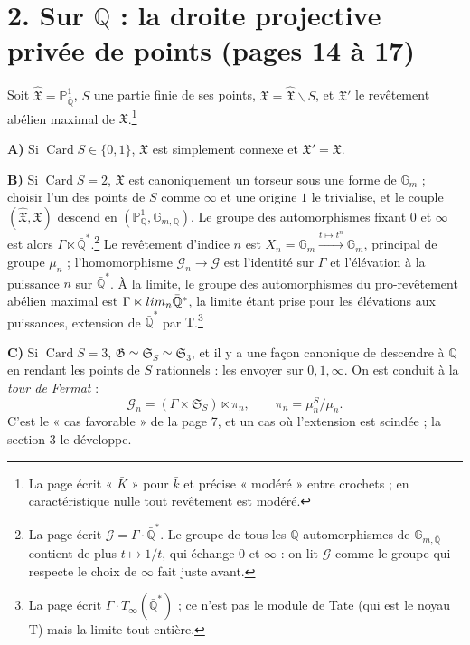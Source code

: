 \documentclass[11pt,a4paper]{article}
\begin{document}
\section*{2. Sur $\mathbb{Q}$ : la droite projective privée de points (pages 14 à 17)}

Soit $\hat{\mathfrak{X}} = \mathbb{P}^{1}_{\bar{\mathbb{Q}}}$, $S$ une partie
finie de ses points, $\mathfrak{X} = \hat{\mathfrak{X}} \smallsetminus S$, et
$\mathfrak{X}'$ le revêtement abélien maximal de $\mathfrak{X}$.\footnote{La
page écrit « $\bar{K}$ » pour $\bar{k}$ et précise « modéré » entre crochets ;
en caractéristique nulle tout revêtement est modéré.}

\textbf{A)} Si $\operatorname{Card} S \in \{0, 1\}$, $\mathfrak{X}$ est
simplement connexe et $\mathfrak{X}' = \mathfrak{X}$.

\textbf{B)} Si $\operatorname{Card} S = 2$, $\mathfrak{X}$ est canoniquement un
torseur sous une forme de $\mathbb{G}_{m}$ ; choisir l'un des points de $S$
comme $\infty$ et une origine $1$ le trivialise, et le couple
$(\hat{\mathfrak{X}}, \mathfrak{X})$ descend en $(\mathbb{P}^{1}_{\mathbb{Q}},
\mathbb{G}_{m,\mathbb{Q}})$. Le groupe des automorphismes fixant $0$ et $\infty$
est alors $\Gamma \ltimes \bar{\mathbb{Q}}^{*}$.\footnote{La page écrit
$\mathcal{G} = \Gamma \cdot \bar{\mathbb{Q}}^{*}$. Le groupe de tous les
$\mathbb{Q}$-automorphismes de $\mathbb{G}_{m,\bar{\mathbb{Q}}}$ contient de plus
$t \mapsto 1/t$, qui échange $0$ et $\infty$ : on lit $\mathcal{G}$ comme le
groupe qui respecte le choix de $\infty$ fait juste avant.} Le revêtement
d'indice $n$ est $X_{n} = \mathbb{G}_{m} \xrightarrow{t \mapsto t^{n}}
\mathbb{G}_{m}$, principal de groupe $\mu_{n}$ ; l'homomorphisme
$\mathcal{G}_{n} \to \mathcal{G}$ est l'identité sur $\Gamma$ et l'élévation à
la puissance $n$ sur $\bar{\mathbb{Q}}^{*}$. À la limite, le groupe des
automorphismes du pro-revêtement abélien maximal est $\Gamma \ltimes
\varprojlim_{n} \bar{\mathbb{Q}}^{*}$, la limite étant prise pour les
élévations aux puissances, extension de $\bar{\mathbb{Q}}^{*}$ par
$\mathrm{T}$.\footnote{La page écrit $\Gamma \cdot
T_{\infty}(\bar{\mathbb{Q}}^{*})$ ; ce n'est pas le module de Tate (qui est le
noyau $\mathrm{T}$) mais la limite tout entière.}

\textbf{C)} Si $\operatorname{Card} S = 3$, $\mathfrak{G} \simeq \mathfrak{S}_{S}
\simeq \mathfrak{S}_{3}$, et il y a une façon canonique de descendre à
$\mathbb{Q}$ en rendant les points de $S$ rationnels : les envoyer sur $0, 1,
\infty$. On est conduit à la \emph{tour de Fermat} :
\[
\mathcal{G}_{n} = (\Gamma \times \mathfrak{S}_{S}) \ltimes \pi_{n},
\qquad \pi_{n} = \mu_{n}^{S}/\mu_{n} .
\]
C'est le « cas favorable » de la page 7, et un cas où l'extension est
scindée ; la section 3 le développe.
\end{document}
